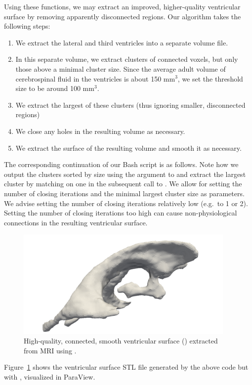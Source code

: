Using these functions, we may extract an improved, higher-quality
ventricular surface by removing apparently disconnected regions. Our
algorithm takes the following steps:
\begin{enumerate}
\item
  We extract the lateral and third ventricles into a separate volume
  file.
\item
  In this separate volume, we extract clusters of connected voxels,
  but only those above a minimal cluster size. Since the average adult
  volume of cerebrospinal fluid in the ventricles is about 150
  mm$^{3}$, we set the threshold size to be around 100 mm$^3$.
\item
  We extract the largest of these clusters (thus ignoring smaller,
  disconnected regions)
\item
  We close any holes in the resulting volume as necessary.
\item
  We extract the surface of the resulting volume and smooth it as
  necessary.
\end{enumerate}
The corresponding continuation of our Bash script is as follows. Note
how we output the clusters sorted by size using the argument
 to  and extract the largest
cluster by matching on one in the subsequent call to
. We allow for setting the number of closing
iterations  and the minimal largest cluster size
 as parameters. We advise setting the number of closing
iterations relatively low (e.g.~to 1 or 2). Setting the number of closing
iterations too high can cause non-physiological connections in the
resulting ventricular surface.


\begin{figure}%
  \centering
  \includegraphics[width=0.95\textwidth]{./graphics/chp4/ernie-ventricles-final.png}
  \caption{High-quality, connected, smooth ventricular surface
    () extracted from MRI using
    \freesurfer{}. }
  \label{fig:chp4:ernie-ventricles-final}
\end{figure}
\noindent Figure~\ref{fig:chp4:ernie-ventricles-final} shows the ventricular
surface STL file generated by the above code but with
, visualized in ParaView.

